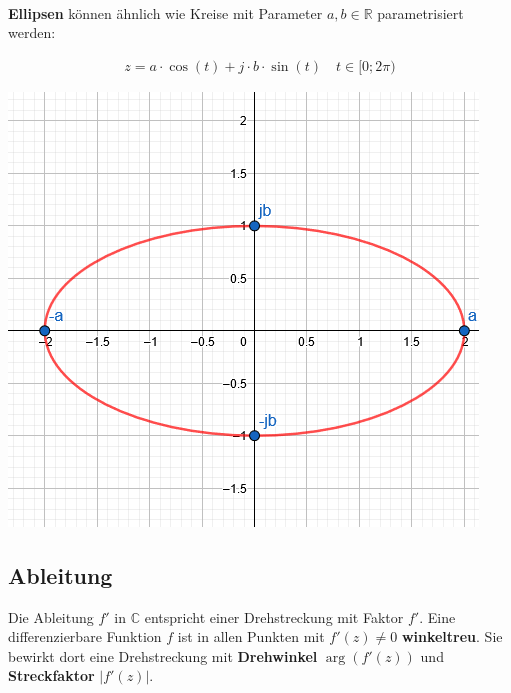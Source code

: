 ~\\
\begin{minipage}{\columnwidth}	
	\noindent\textbf{Ellipsen} können ähnlich wie Kreise mit Parameter $a,b \in \mathbb{R}$ parametrisiert werden:
	
	\begin{minipage}{0.6\textwidth}
		\begin{align*}
			z = a\cdot\cos(t) + j\cdot b \cdot \sin(t) \quad t \in [0; 2\pi)
		\end{align*}
	\end{minipage}%
	\begin{minipage}{0.4\textwidth}
		\includegraphics[width=\columnwidth]{Images/parameter_ellipse}
	\end{minipage}
\end{minipage}

\newpage 

\subsection{Ableitung}
Die Ableitung $f'$ in $\mathbb{C}$ entspricht einer Drehstreckung mit Faktor $f'$. Eine differenzierbare Funktion $f$ ist in allen Punkten mit $f'(z) \neq 0$ \textbf{winkeltreu}. Sie bewirkt dort eine Drehstreckung mit \textbf{Drehwinkel} $\arg(f'(z))$ und \textbf{Streckfaktor} $|f'(z)|$.

